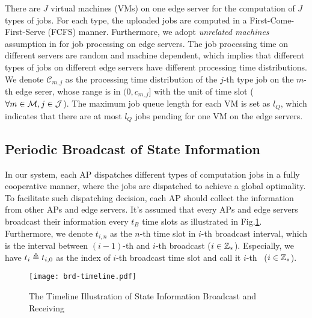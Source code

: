 There are $J$ virtual machines (VMs) on one edge server for the computation of $J$ types of jobs.
For each type, the uploaded jobs are computed in a First-Come-First-Serve (FCFS) manner.
Furthermore, we adopt \emph{unrelated machines} assumption in \cite{tan-online} for job processing on edge servers.
The job processing time on different servers are random and machine dependent, which implies that different types of jobs on different edge servers have different processing time distributions.
We denote $\mathcal{C}_{m,j}$ as the processing time distribution of the $j$-th type job on the $m$-th edge serer, whose range is in $(0, c_{m,j}]$ with the unit of time slot ($\forall m\in\mathcal{M}, j\in\mathcal{J}$).
The maximum job queue length for each VM is set as $l_Q$, which indicates that there are at most $l_Q$ jobs pending for one VM on the edge servers.


\subsection{Periodic Broadcast of State Information}
In our system, each AP dispatches different types of computation jobs in a fully cooperative manner, where the jobs are dispatched to achieve a global optimality.
To facilitate such dispatching decision, each AP should collect the information from other APs and edge servers.
It's assumed that every APs and edge servers broadcast their information every $t_B$ time slots as illustrated in Fig.\ref{fig:brd-timeline}.
Furthermore, we denote $t_{i,n}$ as the $n$-th time slot in $i$-th broadcast interval, which is the interval between $(i-1)$-th and $i$-th broadcast ($i\in\mathbb{Z}_{*}$).
Especially, we have $t_{i} \triangleq t_{i,0}$ as the index of $i$-th broadcast time slot and call it $i$-th \brpoint~($i\in\mathbb{Z}_{*}$).
\begin{figure}[ht]
    \centering
    \texttt{[image: brd-timeline.pdf]}
    \caption{The Timeline Illustration of State Information Broadcast and Receiving}
    \label{fig:brd-timeline}
\end{figure}

